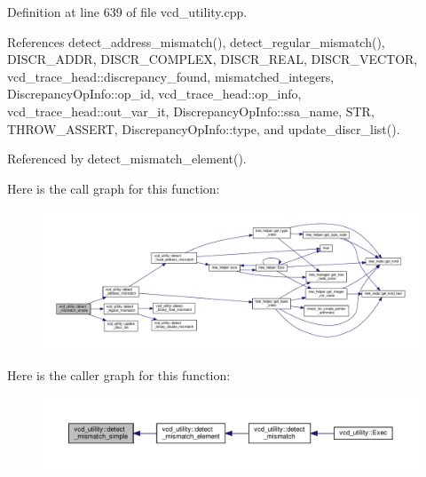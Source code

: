 Definition at line 639 of file vcd\+\_\+utility.\+cpp.



References detect\+\_\+address\+\_\+mismatch(), detect\+\_\+regular\+\_\+mismatch(), D\+I\+S\+C\+R\+\_\+\+A\+D\+DR, D\+I\+S\+C\+R\+\_\+\+C\+O\+M\+P\+L\+EX, D\+I\+S\+C\+R\+\_\+\+R\+E\+AL, D\+I\+S\+C\+R\+\_\+\+V\+E\+C\+T\+OR, vcd\+\_\+trace\+\_\+head\+::discrepancy\+\_\+found, mismatched\+\_\+integers, Discrepancy\+Op\+Info\+::op\+\_\+id, vcd\+\_\+trace\+\_\+head\+::op\+\_\+info, vcd\+\_\+trace\+\_\+head\+::out\+\_\+var\+\_\+it, Discrepancy\+Op\+Info\+::ssa\+\_\+name, S\+TR, T\+H\+R\+O\+W\+\_\+\+A\+S\+S\+E\+RT, Discrepancy\+Op\+Info\+::type, and update\+\_\+discr\+\_\+list().



Referenced by detect\+\_\+mismatch\+\_\+element().

Here is the call graph for this function\+:
\nopagebreak
\begin{figure}[H]
\begin{center}
\leavevmode
\includegraphics[width=350pt]{d8/d51/classvcd__utility_a96a0270243835db1afab5b8c82e3b320_cgraph}
\end{center}
\end{figure}
Here is the caller graph for this function\+:
\nopagebreak
\begin{figure}[H]
\begin{center}
\leavevmode
\includegraphics[width=350pt]{d8/d51/classvcd__utility_a96a0270243835db1afab5b8c82e3b320_icgraph}
\end{center}
\end{figure}
\mbox{\label{classvcd__utility_ad2ab80e69aace43ba9a0d7881880cd1b}} 
